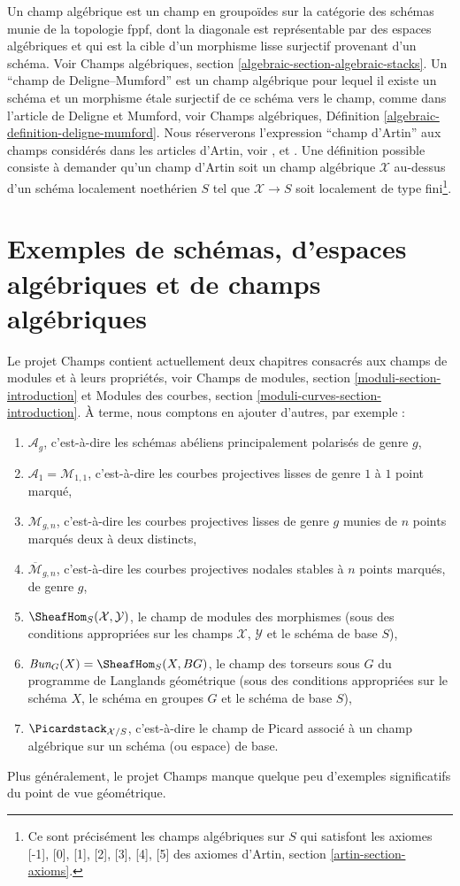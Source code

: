 \noindent
Un champ algébrique est un champ en groupoïdes sur la catégorie des schémas
munie de la topologie fppf, dont la diagonale est représentable par des
espaces algébriques et qui est la cible d'un morphisme lisse surjectif provenant d'un schéma.
Voir Champs algébriques, section \ref{algebraic-section-algebraic-stacks}.
Un ``champ de Deligne--Mumford'' est un champ algébrique pour lequel il existe
un schéma et un morphisme \'etale surjectif de ce schéma vers le champ,
comme dans l'article \cite{DM} de Deligne et Mumford, voir
Champs algébriques, Définition \ref{algebraic-definition-deligne-mumford}.
Nous réserverons l'expression ``champ d'Artin'' aux champs considérés dans les articles
d'Artin, voir \cite{ArtinI}, \cite{ArtinII} et \cite{ArtinVersal}.
Une définition possible consiste à demander qu'un champ d'Artin soit un champ algébrique
$\mathcal{X}$ au-dessus d'un schéma localement noethérien $S$ tel que
$\mathcal{X} \to S$ soit
localement de type fini\footnote{Ce sont précisément les champs algébriques
sur $S$ qui satisfont les axiomes [-1], [0], [1], [2], [3], [4], [5]
des axiomes d'Artin, section \ref{artin-section-axioms}.}.


\section{Exemples de schémas, d'espaces algébriques et de champs algébriques}
\label{section-examples-stacks}

\noindent
Le projet Champs contient actuellement deux chapitres consacrés aux
champs de modules et à leurs propriétés, voir
Champs de modules, section \ref{moduli-section-introduction} et
Modules des courbes, section \ref{moduli-curves-section-introduction}.
À terme, nous comptons en ajouter d'autres, par exemple :
\begin{enumerate}
\item $\mathcal{A}_g$,
c'est-à-dire les schémas abéliens principalement polarisés de genre $g$,
\item $\mathcal{A}_1 = \mathcal{M}_{1, 1}$, c'est-à-dire
les courbes projectives lisses de genre $1$ à $1$ point marqué,
\item $\mathcal{M}_{g, n}$, c'est-à-dire les courbes projectives lisses de genre $g$
munies de $n$ points marqués deux à deux distincts,
\item $\overline{\mathcal{M}}_{g, n}$, c'est-à-dire les
courbes projectives nodales stables à $n$ points marqués, de genre $g$,
\item $\SheafHom_S(\mathcal{X}, \mathcal{Y})$, le champ de modules des morphismes
(sous des conditions appropriées sur les champs $\mathcal{X}$, $\mathcal{Y}$
et le schéma de base $S$),
\item $\textit{Bun}_G(X) = \SheafHom_S(X, BG)$, le champ des torseurs sous $G$
du programme de Langlands géométrique (sous des conditions appropriées sur le schéma
$X$, le schéma en groupes $G$ et le schéma de base $S$),
\item $\Picardstack_{\mathcal{X}/S}$, c'est-à-dire le champ de Picard associé
à un champ algébrique sur un schéma (ou espace) de base.
\end{enumerate}
Plus généralement, le projet Champs manque quelque peu
d'exemples significatifs du point de vue géométrique.


